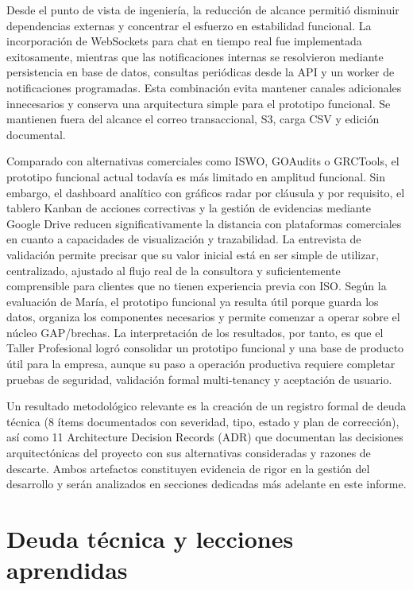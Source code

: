 \documentclass[final]{udpthesis}
\begin{document}
Desde el punto de vista de ingeniería, la reducción de alcance permitió disminuir dependencias externas y concentrar el esfuerzo en estabilidad funcional. La incorporación de WebSockets para chat en tiempo real fue implementada exitosamente, mientras que las notificaciones internas se resolvieron mediante persistencia en base de datos, consultas periódicas desde la API y un worker de notificaciones programadas. Esta combinación evita mantener canales adicionales innecesarios y conserva una arquitectura simple para el prototipo funcional. Se mantienen fuera del alcance el correo transaccional, S3, carga CSV y edición documental.

Comparado con alternativas comerciales como ISWO, GOAudits o GRCTools, el prototipo funcional actual todavía es más limitado en amplitud funcional. Sin embargo, el dashboard analítico con gráficos radar por cláusula y por requisito, el tablero Kanban de acciones correctivas y la gestión de evidencias mediante Google Drive reducen significativamente la distancia con plataformas comerciales en cuanto a capacidades de visualización y trazabilidad. La entrevista de validación permite precisar que su valor inicial está en ser simple de utilizar, centralizado, ajustado al flujo real de la consultora y suficientemente comprensible para clientes que no tienen experiencia previa con ISO. Según la evaluación de María, el prototipo funcional ya resulta útil porque guarda los datos, organiza los componentes necesarios y permite comenzar a operar sobre el núcleo GAP/brechas. La interpretación de los resultados, por tanto, es que el Taller Profesional logró consolidar un prototipo funcional y una base de producto útil para la empresa, aunque su paso a operación productiva requiere completar pruebas de seguridad, validación formal multi-tenancy y aceptación de usuario.

Un resultado metodológico relevante es la creación de un registro formal de deuda técnica (8 ítems documentados con severidad, tipo, estado y plan de corrección), así como 11 Architecture Decision Records (ADR) que documentan las decisiones arquitectónicas del proyecto con sus alternativas consideradas y razones de descarte. Ambos artefactos constituyen evidencia de rigor en la gestión del desarrollo y serán analizados en secciones dedicadas más adelante en este informe.

\chapter{Deuda técnica y lecciones aprendidas}
\end{document}
